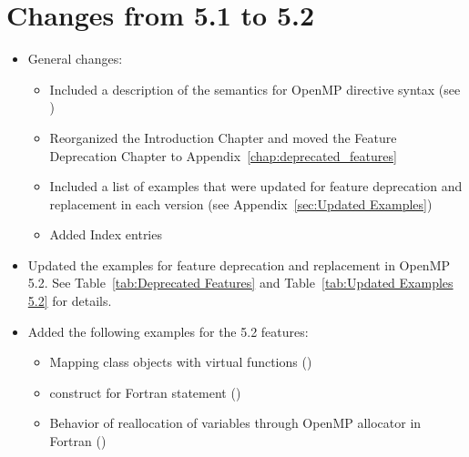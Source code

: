 \label{chap:history}

\section{Changes from 5.1 to 5.2}
\label{sec:history_51_to_52}

\begin{itemize}
\item General changes:
\begin{itemize}
\item Included a description of the semantics for OpenMP directive syntax
 (see )
\item Reorganized the Introduction Chapter and moved the Feature 
Deprecation Chapter to Appendix~\ref{chap:deprecated_features}
\item Included a list of examples that were updated for feature deprecation
and replacement in each version (see Appendix~\ref{sec:Updated Examples})
\item Added Index entries
\end{itemize}

\item Updated the examples for feature deprecation and replacement in OpenMP 5.2.
See Table~\ref{tab:Deprecated Features} and 
Table~\ref{tab:Updated Examples 5.2} for details.

\item Added the following examples for the 5.2 features:
\begin{itemize}
  \item Mapping class objects with virtual functions
     ()
  \item {} construct for Fortran  statement
     ()
  \item Behavior of reallocation of variables through OpenMP allocator in
     Fortran ()
\end{itemize}


\end{itemize}
